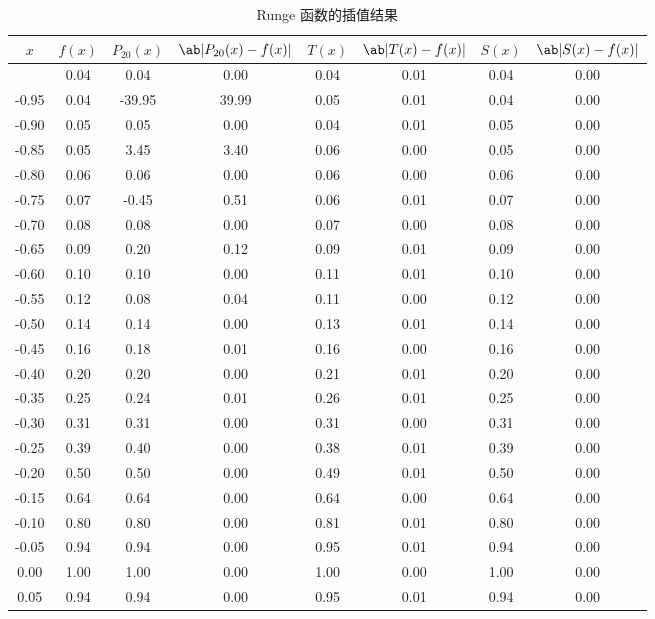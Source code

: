 \documentclass[12pt, a4paper, oneside]{article}
\begin{document}
\begin{longtable}{|c|c||c|c||c|c||c|c|}
    \caption{Runge 函数的插值结果\label{tab:1}}\\
    \hline
    $x$ & $f(x)$ & $P_{20}(x)$ & $\ab\vert P_{20}(x) - f(x)\vert$ & $T(x)$ & $\ab\vert T(x) - f(x) \vert$ & $S(x)$ & $\ab\vert S(x) - f(x) \vert$ \\
    \hline
    \endhead
    \hline
    \endfoot
    -1.00 & 0.04 & 0.04 & 0.00 & 0.04 & 0.01 & 0.04 & 0.00 \\
    -0.95 & 0.04 & -39.95 & 39.99 & 0.05 & 0.01 & 0.04 & 0.00 \\
    -0.90 & 0.05 & 0.05 & 0.00 & 0.04 & 0.01 & 0.05 & 0.00 \\
    -0.85 & 0.05 & 3.45 & 3.40 & 0.06 & 0.00 & 0.05 & 0.00 \\
    -0.80 & 0.06 & 0.06 & 0.00 & 0.06 & 0.00 & 0.06 & 0.00 \\
    -0.75 & 0.07 & -0.45 & 0.51 & 0.06 & 0.01 & 0.07 & 0.00 \\
    -0.70 & 0.08 & 0.08 & 0.00 & 0.07 & 0.00 & 0.08 & 0.00 \\
    -0.65 & 0.09 & 0.20 & 0.12 & 0.09 & 0.01 & 0.09 & 0.00 \\
    -0.60 & 0.10 & 0.10 & 0.00 & 0.11 & 0.01 & 0.10 & 0.00 \\
    -0.55 & 0.12 & 0.08 & 0.04 & 0.11 & 0.00 & 0.12 & 0.00 \\
    -0.50 & 0.14 & 0.14 & 0.00 & 0.13 & 0.01 & 0.14 & 0.00 \\
    -0.45 & 0.16 & 0.18 & 0.01 & 0.16 & 0.00 & 0.16 & 0.00 \\
    -0.40 & 0.20 & 0.20 & 0.00 & 0.21 & 0.01 & 0.20 & 0.00 \\
    -0.35 & 0.25 & 0.24 & 0.01 & 0.26 & 0.01 & 0.25 & 0.00 \\
    -0.30 & 0.31 & 0.31 & 0.00 & 0.31 & 0.00 & 0.31 & 0.00 \\
    -0.25 & 0.39 & 0.40 & 0.00 & 0.38 & 0.01 & 0.39 & 0.00 \\
    -0.20 & 0.50 & 0.50 & 0.00 & 0.49 & 0.01 & 0.50 & 0.00 \\
    -0.15 & 0.64 & 0.64 & 0.00 & 0.64 & 0.00 & 0.64 & 0.00 \\
    -0.10 & 0.80 & 0.80 & 0.00 & 0.81 & 0.01 & 0.80 & 0.00 \\
    -0.05 & 0.94 & 0.94 & 0.00 & 0.95 & 0.01 & 0.94 & 0.00 \\
    0.00 & 1.00 & 1.00 & 0.00 & 1.00 & 0.00 & 1.00 & 0.00 \\
    0.05 & 0.94 & 0.94 & 0.00 & 0.95 & 0.01 & 0.94 & 0.00 \\

\end{longtable}
\end{document}

